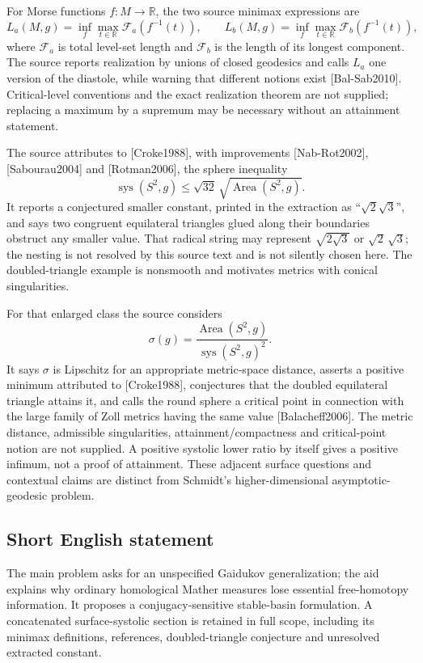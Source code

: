 \documentclass[11pt]{article}
\begin{document}
For Morse functions \(f:M\to\mathbb R\), the two source minimax expressions are
\[
 L_a(M,g)=\inf_f\max_{t\in\mathbb R}
                 \mathcal F_a(f^{-1}(t)),\qquad
 L_b(M,g)=\inf_f\max_{t\in\mathbb R}
                 \mathcal F_b(f^{-1}(t)),
\]
where \(\mathcal F_a\) is total level-set length and \(\mathcal F_b\) is the length of its longest component. The source reports realization by unions of closed geodesics and calls \(L_a\) one version of the diastole, while warning that different notions exist [Bal-Sab2010]. Critical-level conventions and the exact realization theorem are not supplied; replacing a maximum by a supremum may be necessary without an attainment statement.

The source attributes to [Croke1988], with improvements [Nab-Rot2002], [Sabourau2004] and [Rotman2006], the sphere inequality
\[
 \operatorname{sys}(S^2,g)\leq\sqrt{32}\,
                          \sqrt{\operatorname{Area}(S^2,g)}.
\]
It reports a conjectured smaller constant, printed in the extraction as ``\(\sqrt2\sqrt3\)'', and says two congruent equilateral triangles glued along their boundaries obstruct any smaller value. That radical string may represent \(\sqrt{2\sqrt3}\) or \(\sqrt2\,\sqrt3\); the nesting is not resolved by this source text and is not silently chosen here. The doubled-triangle example is nonsmooth and motivates metrics with conical singularities.

For that enlarged class the source considers
\[
 \sigma(g)=\frac{\operatorname{Area}(S^2,g)}
                 {\operatorname{sys}(S^2,g)^2}.
\]
It says \(\sigma\) is Lipschitz for an appropriate metric-space distance, asserts a positive minimum attributed to [Croke1988], conjectures that the doubled equilateral triangle attains it, and calls the round sphere a critical point in connection with the large family of Zoll metrics having the same value [Balacheff2006]. The metric distance, admissible singularities, attainment/compactness and critical-point notion are not supplied. A positive systolic lower ratio by itself gives a positive infimum, not a proof of attainment. These adjacent surface questions and contextual claims are distinct from Schmidt's higher-dimensional asymptotic-geodesic problem.
\subsection{Short English statement}
The main problem asks for an unspecified Gaidukov generalization; the aid explains why ordinary homological Mather measures lose essential free-homotopy information. It proposes a conjugacy-sensitive stable-basin formulation. A concatenated surface-systolic section is retained in full scope, including its minimax definitions, references, doubled-triangle conjecture and unresolved extracted constant.
\end{document}
